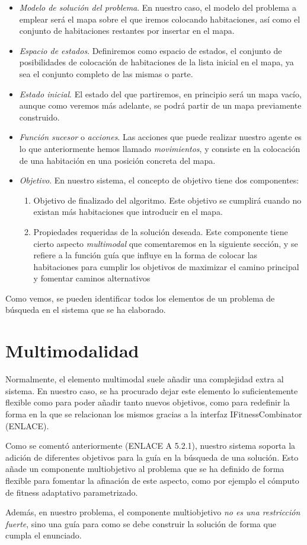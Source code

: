 \begin{itemize}
	\item \emph{Modelo de solución del problema}. En nuestro caso, el modelo del problema a emplear será el mapa sobre el que iremos colocando habitaciones, así como el conjunto de habitaciones restantes por insertar en el mapa.
	\item \emph{Espacio de estados}. Definiremos como espacio de estados, el conjunto de posibilidades de colocación de habitaciones de la lista inicial en el mapa, ya sea el conjunto completo de las mismas o parte.
	\item \emph{Estado inicial}. El estado del que partiremos, en principio será un mapa vacío, aunque como veremos más adelante, se podrá partir de un mapa previamente construido.
	\item \emph{Función sucesor} o \emph{acciones}. Las acciones que puede realizar nuestro agente es lo que anteriormente hemos llamado \emph{movimientos}, y consiste en la colocación de una habitación en una posición concreta del mapa.
	\item \emph{Objetivo}. En nuestro sistema, el concepto de objetivo tiene dos componentes:
		\begin{enumerate}
			\item Objetivo de finalizado del algoritmo. Este objetivo se cumplirá cuando no existan más habitaciones que introducir en el mapa.
			\item Propiedades requeridas de la solución deseada. Este componente tiene cierto aspecto \emph{multimodal} que comentaremos en la siguiente sección, y se refiere a la función guía que influye en la forma de colocar las habitaciones para cumplir los objetivos de maximizar el camino principal y fomentar caminos alternativos
		\end{enumerate}
\end{itemize}

Como vemos, se pueden identificar todos los elementos de un problema de búsqueda en el sistema que se ha elaborado.

\section{Multimodalidad}

Normalmente, el elemento multimodal suele añadir una complejidad extra al sistema. En nuestro caso, se ha procurado dejar este elemento lo suficientemente flexible como para poder añadir tanto nuevos objetivos, como para redefinir la forma en la que se relacionan los mismos gracias a la interfaz IFitnessCombinator (ENLACE).

Como se comentó anteriormente (ENLACE A 5.2.1), nuestro sistema soporta la adición de diferentes objetivos para la guía en la búsqueda de una solución. Esto añade un componente multiobjetivo al problema que se ha definido de forma flexible para fomentar la afinación de este aspecto, como por ejemplo el cómputo de fitness adaptativo parametrizado.

Además, en nuestro problema, el componente multiobjetivo \emph{no es una restricción fuerte}, sino una guía para como se debe construir la solución de forma que cumpla el enunciado.

